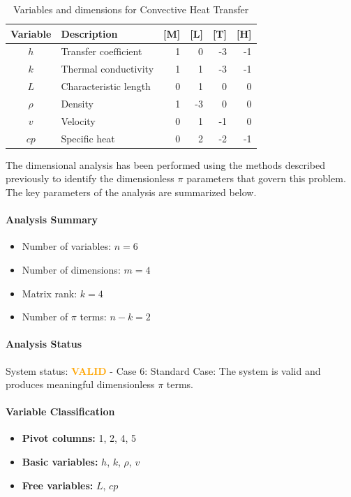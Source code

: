 \begin{table}[H]
\centering
\begin{tabular}{|c|l|r|r|r|r|}
\hline
\textbf{Variable} & \textbf{Description} & \textbf{[M]} & \textbf{[L]} & \textbf{[T]} & \textbf{[H]} \\
\hline
$h$ & Transfer coefficient & 1 & 0 & -3 & -1 \\
$k$ & Thermal conductivity & 1 & 1 & -3 & -1 \\
$L$ & Characteristic length & 0 & 1 & 0 & 0 \\
$\rho$ & Density & 1 & -3 & 0 & 0 \\
$v$ & Velocity & 0 & 1 & -1 & 0 \\
$cp$ & Specific heat & 0 & 2 & -2 & -1 \\

\hline
\end{tabular}
\caption{Variables and dimensions for Convective Heat Transfer}
\end{table}

The dimensional analysis has been performed using the methods described previously to identify the dimensionless $\pi$ parameters that govern this problem. The key parameters of the analysis are summarized below.

\paragraph{Analysis Summary}
\begin{itemize}
\item Number of variables: $n = 6$
\item Number of dimensions: $m = 4$
\item Matrix rank: $k = 4$
\item Number of $\pi$ terms: $n - k = 2$
\end{itemize}

\paragraph{Analysis Status}
System status: \textcolor{orange}{\textbf{VALID}} - Case 6: Standard Case: The system is valid and produces meaningful dimensionless $\pi$ terms.


\paragraph{Variable Classification}
\begin{itemize}
\item \textbf{Pivot columns:} 1, 2, 4, 5
\item \textbf{Basic variables:} $h$, $k$, $\rho$, $v$
\item \textbf{Free variables:} $L$, $cp$
\end{itemize}

